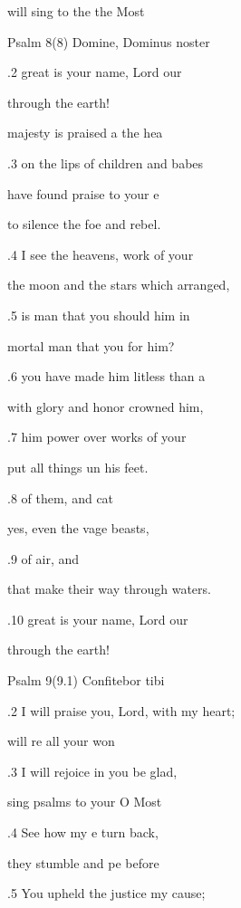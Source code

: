  will sing to the  the Most  

Psalm 8(8) Domine, Dominus noster 


.2  great is your name,  Lord our  

through  the earth! 

 majesty is praised a the hea 

.3 on the lips of children and  babes 

 have found praise to  your e 

to silence the foe and  rebel. 

.4  I see the heavens,  work of your  

the moon and the stars which  arranged, 

.5  is man that you should  him in  

mortal man that you  for him? 

.6  you have made him litless than a  

with glory and honor  crowned him, 

.7  him power over  works of your  

put all things un his feet. 

.8  of them,  and cat 

yes, even the vage beasts, 

.9  of  air, and  

that make their way through  waters. 

.10  great is your name,  Lord our  

through  the earth! 

Psalm 9(9.1) Confitebor tibi 


.2 I will praise you, Lord, with  my heart; 

 will re all your won 

.3 I will rejoice in you  be glad, 

 sing psalms to your  O Most  

.4 See how my e turn back, 

 they stumble and pe before  

.5 You upheld the justice  my cause; 

